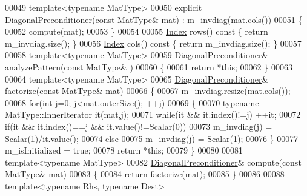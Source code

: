 \begin{DoxyCode}
00049     \textcolor{keyword}{template}<\textcolor{keyword}{typename} MatType>
00050     \textcolor{keyword}{explicit} \hyperlink{group___iterative_linear_solvers___module_class_eigen_1_1_diagonal_preconditioner}{DiagonalPreconditioner}(\textcolor{keyword}{const} MatType& mat) : m\_invdiag(mat.cols())
00051     \{
00052       compute(mat);
00053     \}
00054 
00055     \hyperlink{namespace_eigen_a62e77e0933482dafde8fe197d9a2cfde}{Index} rows()\textcolor{keyword}{ const }\{ \textcolor{keywordflow}{return} m\_invdiag.size(); \}
00056     \hyperlink{namespace_eigen_a62e77e0933482dafde8fe197d9a2cfde}{Index} cols()\textcolor{keyword}{ const }\{ \textcolor{keywordflow}{return} m\_invdiag.size(); \}
00057     
00058     \textcolor{keyword}{template}<\textcolor{keyword}{typename} MatType>
00059     \hyperlink{group___iterative_linear_solvers___module_class_eigen_1_1_diagonal_preconditioner}{DiagonalPreconditioner}& analyzePattern(\textcolor{keyword}{const} MatType& )
00060     \{
00061       \textcolor{keywordflow}{return} *\textcolor{keyword}{this};
00062     \}
00063     
00064     \textcolor{keyword}{template}<\textcolor{keyword}{typename} MatType>
00065     \hyperlink{group___iterative_linear_solvers___module_class_eigen_1_1_diagonal_preconditioner}{DiagonalPreconditioner}& factorize(\textcolor{keyword}{const} MatType& mat)
00066     \{
00067       m\_invdiag.\hyperlink{class_eigen_1_1_plain_object_base_a99d9054ee2d5a40c6e00ded0265e9cea}{resize}(mat.cols());
00068       \textcolor{keywordflow}{for}(\textcolor{keywordtype}{int} j=0; j<mat.outerSize(); ++j)
00069       \{
00070         \textcolor{keyword}{typename} MatType::InnerIterator it(mat,j);
00071         \textcolor{keywordflow}{while}(it && it.index()!=j) ++it;
00072         \textcolor{keywordflow}{if}(it && it.index()==j && it.value()!=Scalar(0))
00073           m\_invdiag(j) = Scalar(1)/it.value();
00074         \textcolor{keywordflow}{else}
00075           m\_invdiag(j) = Scalar(1);
00076       \}
00077       m\_isInitialized = \textcolor{keyword}{true};
00078       \textcolor{keywordflow}{return} *\textcolor{keyword}{this};
00079     \}
00080     
00081     \textcolor{keyword}{template}<\textcolor{keyword}{typename} MatType>
00082     \hyperlink{group___iterative_linear_solvers___module_class_eigen_1_1_diagonal_preconditioner}{DiagonalPreconditioner}& compute(\textcolor{keyword}{const} MatType& mat)
00083     \{
00084       \textcolor{keywordflow}{return} factorize(mat);
00085     \}
00086 
00088     \textcolor{keyword}{template}<\textcolor{keyword}{typename} Rhs, \textcolor{keyword}{typename} Dest>

\end{DoxyCode}
